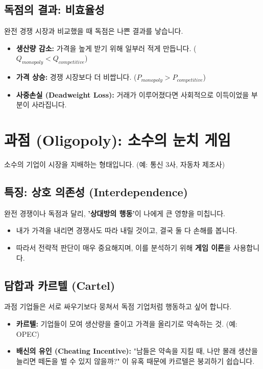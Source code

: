 \documentclass[11pt,a4paper]{book}
\begin{document}
\subsection{독점의 결과: 비효율성}

완전 경쟁 시장과 비교했을 때 독점은 나쁜 결과를 낳습니다.
\begin{itemize}
    \item \textbf{생산량 감소:} 가격을 높게 받기 위해 일부러 적게 만듭니다. ($Q_{monopoly} < Q_{competitive}$)
    \item \textbf{가격 상승:} 경쟁 시장보다 더 비쌉니다. ($P_{monopoly} > P_{competitive}$)
    \item \textbf{사중손실 (Deadweight Loss):} 거래가 이루어졌다면 사회적으로 이득이었을 부분이 사라집니다.
\end{itemize}

\section{과점 (Oligopoly): 소수의 눈치 게임}

소수의 기업이 시장을 지배하는 형태입니다. (예: 통신 3사, 자동차 제조사)

\subsection{특징: 상호 의존성 (Interdependence)}
완전 경쟁이나 독점과 달리, \textbf{'상대방의 행동'}이 나에게 큰 영향을 미칩니다.
\begin{itemize}
    \item 내가 가격을 내리면 경쟁사도 따라 내릴 것이고, 결국 둘 다 손해를 봅니다.
    \item 따라서 전략적 판단이 매우 중요해지며, 이를 분석하기 위해 \textbf{게임 이론}을 사용합니다.
\end{itemize}

\subsection{담합과 카르텔 (Cartel)}
과점 기업들은 서로 싸우기보다 뭉쳐서 독점 기업처럼 행동하고 싶어 합니다.
\begin{itemize}
    \item \textbf{카르텔:} 기업들이 모여 생산량을 줄이고 가격을 올리기로 약속하는 것. (예: OPEC)
    \item \textbf{배신의 유인 (Cheating Incentive):} "남들은 약속을 지킬 때, 나만 몰래 생산을 늘리면 떼돈을 벌 수 있지 않을까?" 이 유혹 때문에 카르텔은 붕괴하기 쉽습니다.
\end{itemize}
\end{document}
